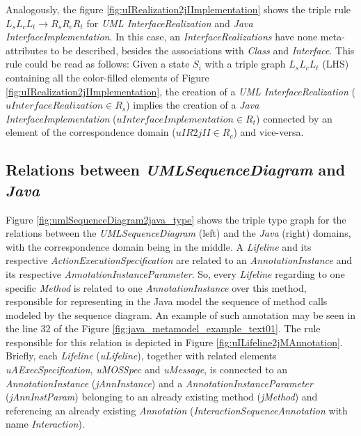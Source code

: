 \documentclass[tuberlin,cic,tc,english,noabntcite]{iiufrgs}
\begin{document}
Analogously, the figure \ref{fig:uIRealization2jIImplementation} shows the triple rule $L_sL_cL_t \rightarrow R_sR_cR_t$ for \emph{UML InterfaceRealization} and \emph{Java InterfaceImplementation}. In this case, an \emph{InterfaceRealizations} have none meta-attributes to be described, besides the associations with \emph{Class} and \emph{Interface}. This rule could be read as follows: Given a state $S_i$ with a triple graph $L_sL_cL_t$ (LHS) containing all the color-filled elements of Figure \ref{fig:uIRealization2jIImplementation}, the creation of a \emph{UML InterfaceRealization} ($uInterfaceRealization \in R_s$) implies the creation of a \emph{Java InterfaceImplementation} ($uInterfaceImplementation \in R_t$) connected by an element of the correspondence domain ($uIR2jII \in R_c$) and vice-versa.

\subsection{Relations between \emph{UMLSequenceDiagram} and \emph{Java}}
\label{subsec:UmlSequenceDiagram2Java}
Figure \ref{fig:umlSequenceDiagram2java_type} shows the triple type graph for the relations between the \emph{UMLSequenceDiagram} (left) and the \emph{Java} (right) domains, with the correspondence domain being in the middle. A \emph{Lifeline} and its respective \emph{ActionExecutionSpecification} are related to an \emph{AnnotationInstance} and its respective \emph{AnnotationInstanceParameter}. So, every \emph{Lifeline} regarding to one specific \emph{Method} is related to one \emph{AnnotationInstance} over this method, responsible for representing in the Java model the sequence of method calls modeled by the sequence diagram. An example of such annotation may be seen in the line 32 of the Figure \ref{fig:java_metamodel_example_text01}. The rule responsible for this relation is depicted in Figure \ref{fig:uILifeline2jMAnnotation}. Briefly, each \emph{Lifeline} (\emph{uLifeline}), together with related elements \emph{uAExecSpecification}, \emph{uMOSSpec} and \emph{uMessage}, is connected to an \emph{AnnotationInstance} (\emph{jAnnInstance}) and a \emph{AnnotationInstanceParameter} (\emph{jAnnInstParam}) belonging to an already existing method (\emph{jMethod}) and referencing an already existing \emph{Annotation} (\emph{InteractionSequenceAnnotation} with name \emph{Interaction}).
\end{document}
